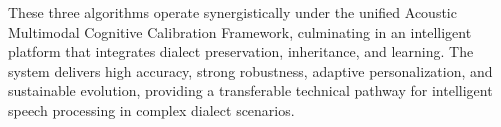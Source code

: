 \begin{abstract*}
These three algorithms operate synergistically under the unified Acoustic Multimodal Cognitive Calibration Framework, culminating in an intelligent platform that integrates dialect preservation, inheritance, and learning. The system delivers high accuracy, strong robustness, adaptive personalization, and sustainable evolution, providing a transferable technical pathway for intelligent speech processing in complex dialect scenarios.
\end{abstract*}

